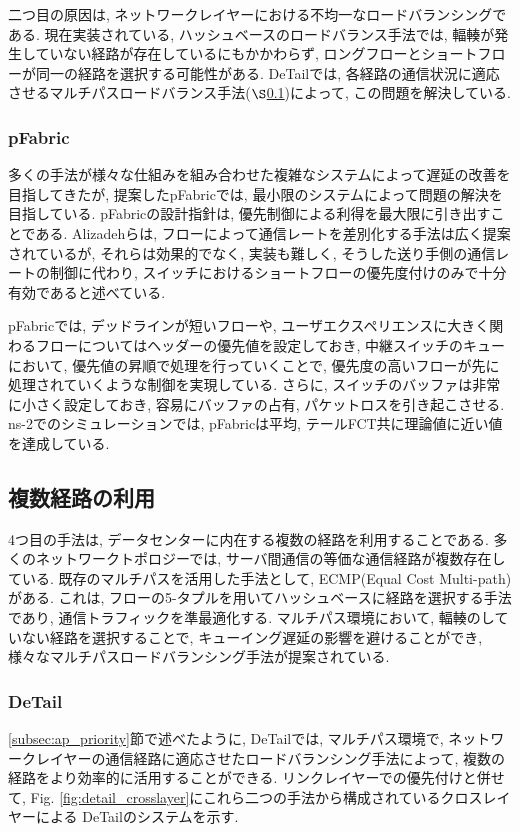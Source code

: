 二つ目の原因は, ネットワークレイヤーにおける不均一なロードバランシングである. 
現在実装されている, ハッシュベースのロードバランス手法では, 輻輳が発生していない経路が存在しているにもかかわらず,
ロングフローとショートフローが同一の経路を選択する可能性がある. 
DeTailでは, 各経路の通信状況に適応させるマルチパスロードバランス手法($\S$\ref{subsec:u-multipath})によって,
この問題を解決している.

\subsubsection{pFabric}
多くの手法が様々な仕組みを組み合わせた複雑なシステムによって遅延の改善を目指してきたが, 提案したpFabric\cite{pfabric}では,
最小限のシステムによって問題の解決を目指している. 
pFabricの設計指針は, 優先制御による利得を最大限に引き出すことである. 
Alizadehらは, フローによって通信レートを差別化する手法は広く提案されているが, それらは効果的でなく, 実装も難しく,
そうした送り手側の通信レートの制御に代わり, スイッチにおけるショートフローの優先度付けのみで十分有効であると述べている.

pFabricでは, デッドラインが短いフローや, ユーザエクスペリエンスに大きく関わるフローについてはヘッダーの優先値を設定しておき,
中継スイッチのキューにおいて, 優先値の昇順で処理を行っていくことで, 優先度の高いフローが先に処理されていくような制御を実現している. 
さらに, スイッチのバッファは非常に小さく設定しておき, 容易にバッファの占有, パケットロスを引き起こさせる. 
ns-2でのシミュレーションでは, pFabricは平均, テールFCT共に理論値に近い値を達成している. 

\subsection{複数経路の利用}
\label{subsec:u-multipath}
4つ目の手法は, データセンターに内在する複数の経路を利用することである. 
多くのネットワークトポロジーでは, サーバ間通信の等価な通信経路が複数存在している. 
既存のマルチパスを活用した手法として, ECMP(Equal Cost Multi-path)がある. 
これは,  フローの5-タプルを用いてハッシュベースに経路を選択する手法であり, 通信トラフィックを準最適化する. 
マルチパス環境において, 輻輳のしていない経路を選択することで, キューイング遅延の影響を避けることができ,
様々なマルチパスロードバランシング手法が提案されている. 

\subsubsection{DeTail}
\ref{subsec:ap_priority}節で述べたように, DeTail\cite{detail}では, マルチパス環境で,
ネットワークレイヤーの通信経路に適応させたロードバランシング手法によって, 複数の経路をより効率的に活用することができる. 
リンクレイヤーでの優先付けと併せて, Fig. \ref{fig:detail_crosslayer}にこれら二つの手法から構成されているクロスレイヤーによる
DeTailのシステムを示す. 

